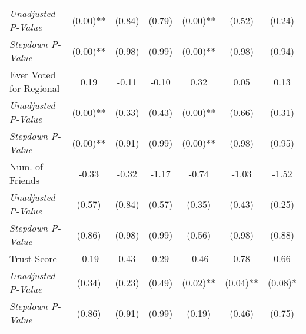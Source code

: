 \begin{tabular}{l c c c c c c}
\quad \textit{Unadjusted P-Value} & (0.00)** & (0.84) & (0.79) & (0.00)** & (0.52) & (0.24) \\
\quad \textit{Stepdown P-Value} & (0.00)** & (0.98) & (0.99) & (0.00)** & (0.98) & (0.94) \\
Ever Voted for Regional & 0.19 & -0.11 & -0.10 & 0.32 & 0.05 & 0.13 \\
\quad \textit{Unadjusted P-Value} & (0.00)** & (0.33) & (0.43) & (0.00)** & (0.66) & (0.31) \\
\quad \textit{Stepdown P-Value} & (0.00)** & (0.91) & (0.99) & (0.00)** & (0.98) & (0.95) \\
Num. of Friends & -0.33 & -0.32 & -1.17 & -0.74 & -1.03 & -1.52 \\
\quad \textit{Unadjusted P-Value} & (0.57) & (0.84) & (0.57) & (0.35) & (0.43) & (0.25) \\
\quad \textit{Stepdown P-Value} & (0.86) & (0.98) & (0.99) & (0.56) & (0.98) & (0.88) \\
Trust Score & -0.19 & 0.43 & 0.29 & -0.46 & 0.78 & 0.66 \\
\quad \textit{Unadjusted P-Value} & (0.34) & (0.23) & (0.49) & (0.02)** & (0.04)** & (0.08)* \\
\quad \textit{Stepdown P-Value} & (0.86) & (0.91) & (0.99) & (0.19) & (0.46) & (0.75) \\
\bottomrule
\end{tabular}
